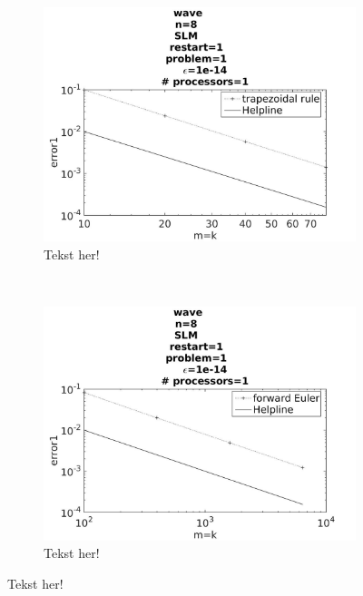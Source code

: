 \begin{figure}[H]
        \centering
        \begin{subfigure}[b]{0.30\textwidth}
                \includegraphics[width=\textwidth]{../MATLAB/fig/intconvtrap.jpg}
                \caption{ Tekst her! }
                \label{fig:intconvtrap}
        \end{subfigure}%
        ~
        \begin{subfigure}[b]{0.30\textwidth}
                \includegraphics[width=\textwidth]{../MATLAB/fig/intconveul.jpg}
                \caption{ Tekst her! }
                \label{fig:intconveul}
        \end{subfigure}

\end{figure}
